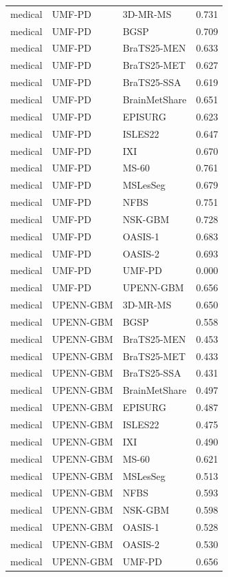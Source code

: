 \begin{tabular}{lllr}
medical & UMF-PD & 3D-MR-MS & 0.731 \\
medical & UMF-PD & BGSP & 0.709 \\
medical & UMF-PD & BraTS25-MEN & 0.633 \\
medical & UMF-PD & BraTS25-MET & 0.627 \\
medical & UMF-PD & BraTS25-SSA & 0.619 \\
medical & UMF-PD & BrainMetShare & 0.651 \\
medical & UMF-PD & EPISURG & 0.623 \\
medical & UMF-PD & ISLES22 & 0.647 \\
medical & UMF-PD & IXI & 0.670 \\
medical & UMF-PD & MS-60 & 0.761 \\
medical & UMF-PD & MSLesSeg & 0.679 \\
medical & UMF-PD & NFBS & 0.751 \\
medical & UMF-PD & NSK-GBM & 0.728 \\
medical & UMF-PD & OASIS-1 & 0.683 \\
medical & UMF-PD & OASIS-2 & 0.693 \\
medical & UMF-PD & UMF-PD & 0.000 \\
medical & UMF-PD & UPENN-GBM & 0.656 \\
medical & UPENN-GBM & 3D-MR-MS & 0.650 \\
medical & UPENN-GBM & BGSP & 0.558 \\
medical & UPENN-GBM & BraTS25-MEN & 0.453 \\
medical & UPENN-GBM & BraTS25-MET & 0.433 \\
medical & UPENN-GBM & BraTS25-SSA & 0.431 \\
medical & UPENN-GBM & BrainMetShare & 0.497 \\
medical & UPENN-GBM & EPISURG & 0.487 \\
medical & UPENN-GBM & ISLES22 & 0.475 \\
medical & UPENN-GBM & IXI & 0.490 \\
medical & UPENN-GBM & MS-60 & 0.621 \\
medical & UPENN-GBM & MSLesSeg & 0.513 \\
medical & UPENN-GBM & NFBS & 0.593 \\
medical & UPENN-GBM & NSK-GBM & 0.598 \\
medical & UPENN-GBM & OASIS-1 & 0.528 \\
medical & UPENN-GBM & OASIS-2 & 0.530 \\
medical & UPENN-GBM & UMF-PD & 0.656 \\

\end{tabular}
